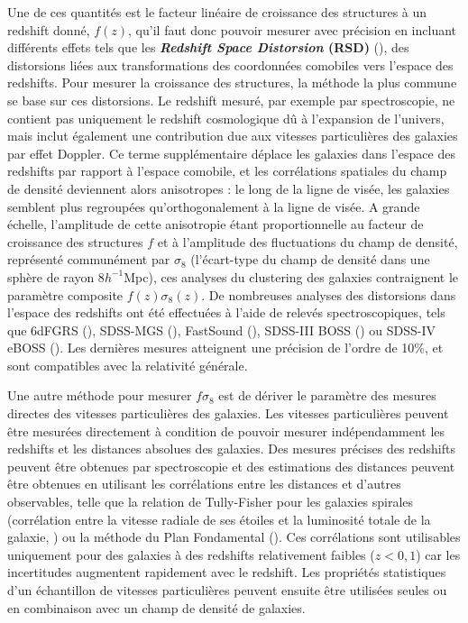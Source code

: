 \documentclass{book}
\begin{document}
Une de ces quantités est le facteur linéaire de croissance des structures à un redshift donné, $f(z)$, qu'il faut donc pouvoir mesurer avec précision en incluant différents effets tels que les \textbf{\textit{Redshift Space Distorsion} (RSD)} (\cite{kaiser_clustering_1987}), des distorsions liées aux transformations des coordonnées comobiles vers l'espace des redshifts. Pour mesurer la croissance des structures, la méthode la plus commune se base sur ces distorsions. Le redshift mesuré, par exemple par spectroscopie, ne contient pas uniquement le redshift cosmologique dû à l'expansion de l'univers, mais inclut également une contribution due aux vitesses particulières des galaxies par effet  Doppler.
Ce terme supplémentaire déplace les galaxies dans l'espace des redshifts par rapport à l'espace comobile, et les corrélations spatiales du champ de densité deviennent alors anisotropes : le long de la ligne de visée, les galaxies semblent plus regroupées qu'orthogonalement à la ligne de visée. A grande échelle, l'amplitude de cette anisotropie étant proportionnelle au facteur de croissance des structures $f$ et à l'amplitude des fluctuations du champ de densité, représenté communément par $\sigma_8$ (l'écart-type du champ de densité dans une sphère de rayon 8$h^{-1}$Mpc), ces analyses du clustering des galaxies contraignent le paramètre composite $f(z)\sigma_8(z)$. De nombreuses analyses des distorsions dans l'espace des redshifts ont été effectuées à l'aide de relevés spectroscopiques, tels que 6dFGRS (\cite{beutler_6df_2012}), SDSS-MGS (\cite{howlett_clustering_2015}), FastSound (\cite{okumura_subaru_2016}), SDSS-III BOSS (\cite{alam_clustering_2017}) ou SDSS-IV eBOSS (\cite{eboss_collaboration_completed_2021}). Les dernières mesures atteignent une précision de l'ordre de 10\%, et sont compatibles avec la relativité générale.

Une autre méthode pour mesurer $f\sigma_8$ est de dériver le paramètre des mesures directes des vitesses particulières des galaxies. Les vitesses particulières peuvent être mesurées directement à condition de pouvoir mesurer indépendamment les redshifts et les distances absolues des galaxies. Des mesures précises des redshifts peuvent être obtenues par spectroscopie et des estimations des distances peuvent être obtenues en utilisant les corrélations entre les distances et d'autres observables, telle que la relation de Tully-Fisher pour les galaxies spirales (corrélation entre la vitesse radiale de ses étoiles et la luminosité totale de la galaxie, \cite{tully_new_1977}) ou la méthode du Plan Fondamental (\cite{djorgovski_fundamental_1987}). Ces corrélations sont utilisables uniquement pour des galaxies à des redshifts relativement faibles ($z < 0,1$) car les incertitudes augmentent rapidement avec le redshift. Les propriétés statistiques d'un échantillon de vitesses particulières peuvent ensuite être utilisées seules ou en combinaison avec un champ de densité de galaxies.
\end{document}
